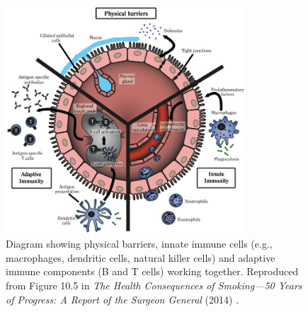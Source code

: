 \documentclass[12pt,a4paper]{report}
\begin{document}
\begin{figure}[htbp]
  \centering
  \includegraphics[width=0.8\textwidth]{images/Diagram_of_innate_and_adaptive_immunity.jpg} %
  \caption[Diagram of Innate and Adaptive Immunity]{Diagram showing physical barriers, innate immune cells (e.g., macrophages, dendritic cells, natural killer cells) and adaptive immune components (B and T cells) working together. Reproduced from Figure 10.5 in \emph{The Health Consequences of Smoking—50 Years of Progress: A Report of the Surgeon General} (2014) \cite{smoking2014}.}
  \label{fig:immunity}
\end{figure}
\end{document}
